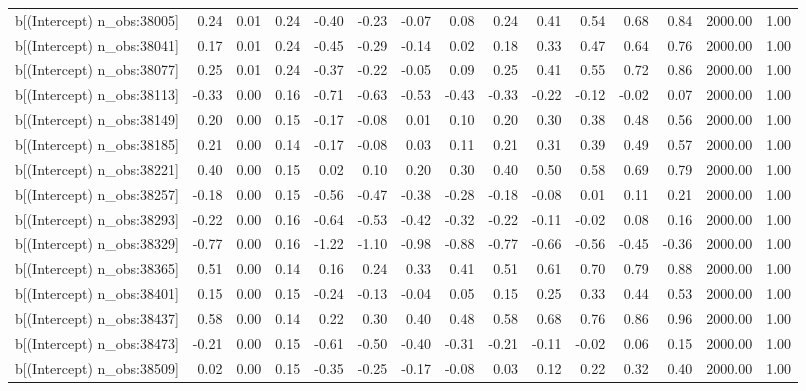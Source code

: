 \begin{table}[ht]
\begin{tabular}{rrrrrrrrrrrrrrr}
  b[(Intercept) n\_obs:38005] & 0.24 & 0.01 & 0.24 & -0.40 & -0.23 & -0.07 & 0.08 & 0.24 & 0.41 & 0.54 & 0.68 & 0.84 & 2000.00 & 1.00 \\ 
  b[(Intercept) n\_obs:38041] & 0.17 & 0.01 & 0.24 & -0.45 & -0.29 & -0.14 & 0.02 & 0.18 & 0.33 & 0.47 & 0.64 & 0.76 & 2000.00 & 1.00 \\ 
  b[(Intercept) n\_obs:38077] & 0.25 & 0.01 & 0.24 & -0.37 & -0.22 & -0.05 & 0.09 & 0.25 & 0.41 & 0.55 & 0.72 & 0.86 & 2000.00 & 1.00 \\ 
  b[(Intercept) n\_obs:38113] & -0.33 & 0.00 & 0.16 & -0.71 & -0.63 & -0.53 & -0.43 & -0.33 & -0.22 & -0.12 & -0.02 & 0.07 & 2000.00 & 1.00 \\ 
  b[(Intercept) n\_obs:38149] & 0.20 & 0.00 & 0.15 & -0.17 & -0.08 & 0.01 & 0.10 & 0.20 & 0.30 & 0.38 & 0.48 & 0.56 & 2000.00 & 1.00 \\ 
  b[(Intercept) n\_obs:38185] & 0.21 & 0.00 & 0.14 & -0.17 & -0.08 & 0.03 & 0.11 & 0.21 & 0.31 & 0.39 & 0.49 & 0.57 & 2000.00 & 1.00 \\ 
  b[(Intercept) n\_obs:38221] & 0.40 & 0.00 & 0.15 & 0.02 & 0.10 & 0.20 & 0.30 & 0.40 & 0.50 & 0.58 & 0.69 & 0.79 & 2000.00 & 1.00 \\ 
  b[(Intercept) n\_obs:38257] & -0.18 & 0.00 & 0.15 & -0.56 & -0.47 & -0.38 & -0.28 & -0.18 & -0.08 & 0.01 & 0.11 & 0.21 & 2000.00 & 1.00 \\ 
  b[(Intercept) n\_obs:38293] & -0.22 & 0.00 & 0.16 & -0.64 & -0.53 & -0.42 & -0.32 & -0.22 & -0.11 & -0.02 & 0.08 & 0.16 & 2000.00 & 1.00 \\ 
  b[(Intercept) n\_obs:38329] & -0.77 & 0.00 & 0.16 & -1.22 & -1.10 & -0.98 & -0.88 & -0.77 & -0.66 & -0.56 & -0.45 & -0.36 & 2000.00 & 1.00 \\ 
  b[(Intercept) n\_obs:38365] & 0.51 & 0.00 & 0.14 & 0.16 & 0.24 & 0.33 & 0.41 & 0.51 & 0.61 & 0.70 & 0.79 & 0.88 & 2000.00 & 1.00 \\ 
  b[(Intercept) n\_obs:38401] & 0.15 & 0.00 & 0.15 & -0.24 & -0.13 & -0.04 & 0.05 & 0.15 & 0.25 & 0.33 & 0.44 & 0.53 & 2000.00 & 1.00 \\ 
  b[(Intercept) n\_obs:38437] & 0.58 & 0.00 & 0.14 & 0.22 & 0.30 & 0.40 & 0.48 & 0.58 & 0.68 & 0.76 & 0.86 & 0.96 & 2000.00 & 1.00 \\ 
  b[(Intercept) n\_obs:38473] & -0.21 & 0.00 & 0.15 & -0.61 & -0.50 & -0.40 & -0.31 & -0.21 & -0.11 & -0.02 & 0.06 & 0.15 & 2000.00 & 1.00 \\ 
  b[(Intercept) n\_obs:38509] & 0.02 & 0.00 & 0.15 & -0.35 & -0.25 & -0.17 & -0.08 & 0.03 & 0.12 & 0.22 & 0.32 & 0.40 & 2000.00 & 1.00 \\ 

\end{tabular}
\end{table}
